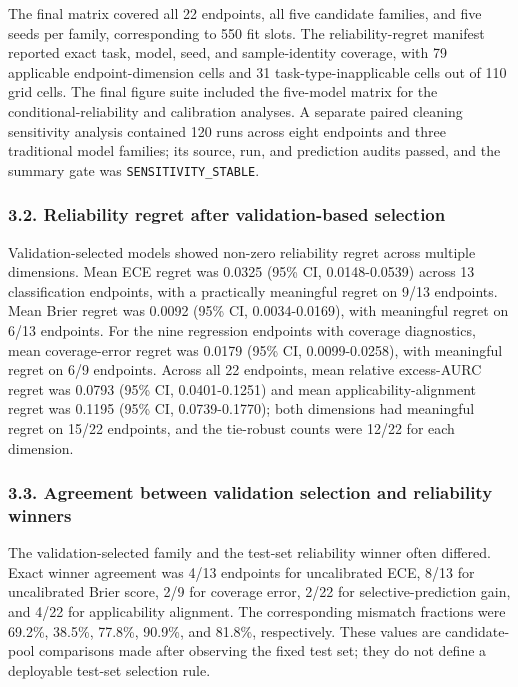 \documentclass[
]{article}
\begin{document}
The final matrix covered all 22 endpoints, all five candidate families,
and five seeds per family, corresponding to 550 fit slots. The
reliability-regret manifest reported exact task, model, seed, and
sample-identity coverage, with 79 applicable endpoint-dimension cells
and 31 task-type-inapplicable cells out of 110 grid cells. The final
figure suite included the five-model matrix for the
conditional-reliability and calibration analyses. A separate
paired cleaning sensitivity analysis contained 120 runs across eight
endpoints and three traditional model families; its source, run, and
prediction audits passed, and the summary gate was
\texttt{SENSITIVITY\_STABLE}.

\subsubsection{3.2. Reliability regret after validation-based
selection}\label{reliability-regret-after-validation-based-selection}

Validation-selected models showed non-zero reliability regret across
multiple dimensions. Mean ECE regret was 0.0325 (95\% CI, 0.0148-0.0539)
across 13 classification endpoints, with a practically meaningful regret
on 9/13 endpoints. Mean Brier regret was 0.0092 (95\% CI,
0.0034-0.0169), with meaningful regret on 6/13 endpoints. For the nine
regression endpoints with coverage diagnostics, mean coverage-error
regret was 0.0179 (95\% CI, 0.0099-0.0258), with meaningful regret on
6/9 endpoints. Across all 22 endpoints, mean relative excess-AURC regret
was 0.0793 (95\% CI, 0.0401-0.1251) and mean applicability-alignment
regret was 0.1195 (95\% CI, 0.0739-0.1770); both dimensions had
meaningful regret on 15/22 endpoints, and the tie-robust counts were
12/22 for each dimension.

\subsubsection{3.3. Agreement between validation selection and
reliability
winners}\label{agreement-between-validation-selection-and-reliability-winners}

The validation-selected family and the test-set reliability winner often
differed. Exact winner agreement was 4/13 endpoints for uncalibrated
ECE, 8/13 for uncalibrated Brier score, 2/9 for coverage error, 2/22 for
selective-prediction gain, and 4/22 for applicability alignment. The
corresponding mismatch fractions were 69.2\%, 38.5\%, 77.8\%, 90.9\%,
and 81.8\%, respectively. These values are candidate-pool comparisons
made after observing the fixed test set; they do not define a deployable
test-set selection rule.
\end{document}
